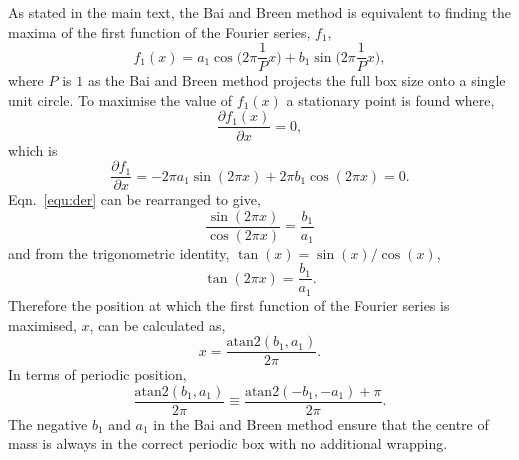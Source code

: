 \documentclass[reprint,superscriptaddress,nobibnotes,amsmath,amssymb,aip]{revtex4-2}
\begin{document}
As stated in the main text, the Bai and Breen method is equivalent to finding the maxima of the first function of the Fourier series, $f_1$,
%
\begin{equation}
    f_1(x) = a_1 \cos{\Big(2\pi\frac{1}{P} x\Big)} + b_1 \sin{\Big(2\pi\frac{1}{P} x\Big)},
\end{equation} 
%
where $P$ is $1$ as the Bai and Breen method projects the full box size onto a single unit circle. 
To maximise the value of $f_1(x)$ a stationary point is found where,
%
\begin{equation}
    \frac{\partial f_1(x)}{\partial x} = 0,
\end{equation}
%
which is 
%
\begin{equation}
    \frac{\partial f_1}{\partial x} = -2 \pi a_1 \sin( 2\pi x) + 2 \pi b_1 \cos( 2\pi x) = 0.
    \label{equ:der}
\end{equation}
%
Eqn.~\ref{equ:der} can be rearranged to give, 
%
\begin{equation}
\frac{\sin(2 \pi x)}{\cos(2 \pi x)} =  \frac{b_1}{a_1}
\end{equation}
%
and from the trigonometric identity, $\tan(x) = \sin(x) / \cos(x)$, 
%
\begin{equation}
    \tan(2 \pi x) = \frac{b_1}{a_1}.
\end{equation}
%
Therefore the position at which the first function of the Fourier series is maximised, $x$, can be calculated as, 
%
\begin{equation}
    x = \frac{\text{atan}2(b_1, a_1)}{2\pi}.
\end{equation}
%
In terms of periodic position, 
%
\begin{equation}
    \frac{\text{atan}2(b_1, a_1)}{2\pi} \equiv \frac{\text{atan}2(-b_1, -a_1) + \pi}{2\pi}.
\end{equation}
%
The negative $b_1$ and $a_1$ in the Bai and Breen method ensure that the centre of mass is always in the correct periodic box with no additional wrapping.


\end{document}
